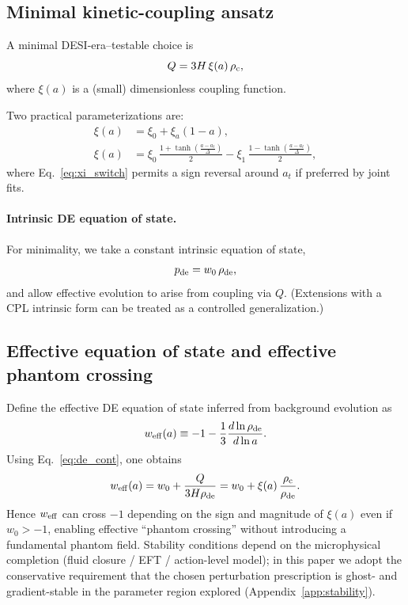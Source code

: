 \documentclass[reprint,aps,prd,nofootinbib,superscriptaddress]{revtex4-2}
\newcommand{\weff}{\ensuremath{w_{\rm eff}}\xspace}
\begin{document}
\subsection{Minimal kinetic-coupling ansatz}

A minimal DESI-era--testable choice is
\begin{equation}
Q = 3H\,\xi(a)\,\rho_{\rm c},
\label{eq:Q_def}
\end{equation}
where $\xi(a)$ is a (small) dimensionless coupling function.

Two practical parameterizations are:
\begin{align}
\xi(a) &= \xi_0 + \xi_a (1-a), \label{eq:xi_cpl}\\
\xi(a) &= \xi_0\,\frac{1+\tanh\!\left(\frac{a-a_t}{\Delta}\right)}{2}
        - \xi_1\,\frac{1-\tanh\!\left(\frac{a-a_t}{\Delta}\right)}{2},
\label{eq:xi_switch}
\end{align}
where Eq.~\eqref{eq:xi_switch} permits a sign reversal around $a_t$ if preferred by joint fits.

\paragraph{Intrinsic DE equation of state.}
For minimality, we take a constant intrinsic equation of state,
\begin{equation}
p_{\rm de} = w_0\,\rho_{\rm de},
\label{eq:w0}
\end{equation}
and allow effective evolution to arise from coupling via $Q$.
(Extensions with a CPL intrinsic form can be treated as a controlled generalization.)

\subsection{Effective equation of state and effective phantom crossing}

Define the effective DE equation of state inferred from background evolution as
\begin{equation}
\weff(a) \equiv -1 - \frac{1}{3}\frac{d\ln\rho_{\rm de}}{d\ln a}.
\label{eq:weff_def}
\end{equation}
Using Eq.~\eqref{eq:de_cont}, one obtains
\begin{equation}
\weff(a) = w_0 + \frac{Q}{3H\rho_{\rm de}}
         = w_0 + \xi(a)\,\frac{\rho_{\rm c}}{\rho_{\rm de}}.
\label{eq:weff_Q}
\end{equation}
Hence $\weff$ can cross $-1$ depending on the sign and magnitude of $\xi(a)$ even if $w_0>-1$,
enabling effective ``phantom crossing'' without introducing a fundamental phantom field.
Stability conditions depend on the microphysical completion (fluid closure / EFT / action-level model); in this paper we adopt the conservative requirement that the chosen perturbation prescription is ghost- and gradient-stable in the parameter region explored (Appendix~\ref{app:stability}).
\end{document}
